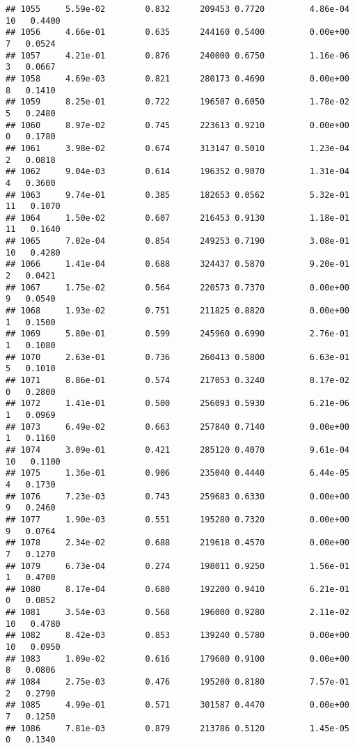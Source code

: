 \documentclass[
]{article}
\begin{document}
\begin{verbatim}
## 1055     5.59e-02        0.832      209453 0.7720         4.86e-04  10   0.4400
## 1056     4.66e-01        0.635      244160 0.5400         0.00e+00   7   0.0524
## 1057     4.21e-01        0.876      240000 0.6750         1.16e-06   3   0.0667
## 1058     4.69e-03        0.821      280173 0.4690         0.00e+00   8   0.1410
## 1059     8.25e-01        0.722      196507 0.6050         1.78e-02   5   0.2480
## 1060     8.97e-02        0.745      223613 0.9210         0.00e+00   0   0.1780
## 1061     3.98e-02        0.674      313147 0.5010         1.23e-04   2   0.0818
## 1062     9.04e-03        0.614      196352 0.9070         1.31e-04   4   0.3600
## 1063     9.74e-01        0.385      182653 0.0562         5.32e-01  11   0.1070
## 1064     1.50e-02        0.607      216453 0.9130         1.18e-01  11   0.1640
## 1065     7.02e-04        0.854      249253 0.7190         3.08e-01  10   0.4280
## 1066     1.41e-04        0.688      324437 0.5870         9.20e-01   2   0.0421
## 1067     1.75e-02        0.564      220573 0.7370         0.00e+00   9   0.0540
## 1068     1.93e-02        0.751      211825 0.8820         0.00e+00   1   0.1500
## 1069     5.80e-01        0.599      245960 0.6990         2.76e-01   1   0.1080
## 1070     2.63e-01        0.736      260413 0.5800         6.63e-01   5   0.1010
## 1071     8.86e-01        0.574      217053 0.3240         8.17e-02   0   0.2800
## 1072     1.41e-01        0.500      256093 0.5930         6.21e-06   1   0.0969
## 1073     6.49e-02        0.663      257840 0.7140         0.00e+00   1   0.1160
## 1074     3.09e-01        0.421      285120 0.4070         9.61e-04  10   0.1100
## 1075     1.36e-01        0.906      235040 0.4440         6.44e-05   4   0.1730
## 1076     7.23e-03        0.743      259683 0.6330         0.00e+00   9   0.2460
## 1077     1.90e-03        0.551      195280 0.7320         0.00e+00   9   0.0764
## 1078     2.34e-02        0.688      219618 0.4570         0.00e+00   7   0.1270
## 1079     6.73e-04        0.274      198011 0.9250         1.56e-01   1   0.4700
## 1080     8.17e-04        0.680      192200 0.9410         6.21e-01   0   0.0852
## 1081     3.54e-03        0.568      196000 0.9280         2.11e-02  10   0.4780
## 1082     8.42e-03        0.853      139240 0.5780         0.00e+00  10   0.0950
## 1083     1.09e-02        0.616      179600 0.9100         0.00e+00   8   0.0806
## 1084     2.75e-03        0.476      195200 0.8180         7.57e-01   2   0.2790
## 1085     4.99e-01        0.571      301587 0.4470         0.00e+00   7   0.1250
## 1086     7.81e-03        0.879      213786 0.5120         1.45e-05   0   0.1340

\end{verbatim}
\end{document}
